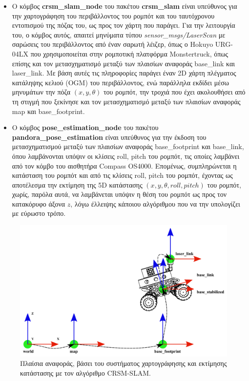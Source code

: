 \begin{itemize}
	\item Ο κόμβος \textbf{crsm{\_}slam{\_}node} του πακέτου \textbf{crsm{\_}slam} \cite{crsm_slam_node} είναι υπεύθυνος για την χαρτογράφηση του περιβάλλοντος του ρομπότ και του ταυτόχρονου εντοπισμού της πόζας του, ως προς τον χάρτη που παράγει. Για την λειτουργία του, ο κόμβος αυτός, απαιτεί μηνύματα τύπου \textit{sensor{\_}msgs/LaserScan} με σαρώσεις του περιβάλλοντος από έναν σαρωτή λέιζερ, όπως ο Hokuyo URG-04LX που χρησιμοποιείται στην ρομποτική πλατφόρμα Monstertruck, όπως επίσης και τον μετασχηματισμό μεταξύ των πλαισίων αναφοράς base{\_}link και laser{\_}link. Με βάση αυτές τις πληροφορίες παράγει έναν 2D χάρτη πλέγματος κατάληψης κελιού (OGM) του περιβάλλοντος, ενώ παράλληλα εκδίδει μέσω μηνυμάτων την πόζα $(x,y,\theta)$ του ρομπότ, την τροχιά που έχει ακολουθήσει από τη στιγμή που ξεκίνησε και τον μετασχηματισμό μεταξύ των πλαισίων αναφοράς map και base{\_}footprint.
	
	\item Ο κόμβος \textbf{pose{\_}estimation{\_}node} του πακέτου \textbf{pandora{\_}pose{\_}estimation} είναι υπεύθυνος για την έκδοση του μετασχηματισμού μεταξύ των πλαισίων αναφοράς base{\_}footprint και base{\_}link, όπου λαμβάνονται υπόψιν οι κλίσεις roll, pitch του ρομπότ, τις οποίες λαμβάνει από τον κόμβο του αισθητήρα Compass OS4000. Επομένως, συμπληρώνεται η κατάσταση του ρομπότ και από τις κλίσεις roll, pitch του ρομπότ, έχοντας ως αποτέλεσμα την εκτίμηση της 5D κατάστασης $(x,y,\theta,roll,pitch)$ του ρομπότ, χωρίς, παρόλα αυτά, να λαμβάνεται υπόψιν η θέση του ρομπότ ως προς τον κατακόρυφο άξονα $z$, λόγω έλλειψης κάποιου αλγόριθμου που να την υπολογίζει με εύρωστο τρόπο.

\end{itemize}

\begin{figure}[!ht]
	\centering
	\includegraphics[width=\linewidth]{Chapters/Chapter4/Figures/slam_1_reference_frames.png}
	\caption{Πλαίσια αναφοράς, βάσει του συστήματος χαρτογράφησης και εκτίμησης κατάστασης με τον αλγόριθμο CRSM-SLAM.}
	\label{fig:slam_1_reference_frames}
\end{figure}

